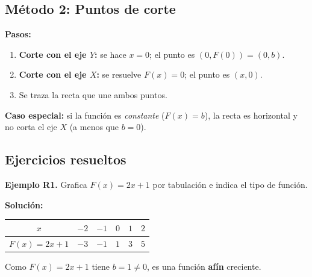 \documentclass[12pt, letterpaper]{article}
\begin{document}
\subsection{Método 2: Puntos de corte}

\begin{cuadropasos}
  \textbf{Pasos:}
  \begin{enumerate}[leftmargin=*]
    \item \textbf{Corte con el eje $Y$:} se hace $x = 0$; el punto es $(0, F(0)) = (0, b)$.
    \item \textbf{Corte con el eje $X$:} se resuelve $F(x) = 0$; el punto es $(x, 0)$.
    \item Se traza la recta que une ambos puntos.
  \end{enumerate}
\end{cuadropasos}

\begin{cuadroadvertencia}
  \textbf{Caso especial:} si la función es \emph{constante} ($F(x) = b$), la recta es horizontal y no corta el eje $X$ (a menos que $b = 0$).
\end{cuadroadvertencia}

\subsection{Ejercicios resueltos}

\textbf{Ejemplo R1.} Grafica $F(x) = 2x + 1$ por tabulación e indica el tipo de función.

\begin{cuadrosolucion}
  \textbf{Solución:}
  \begin{center}
    \begin{tabular}{c|ccccc}
      \toprule
      $x$             & $-2$ & $-1$ & $0$ & $1$ & $2$ \\
      \midrule
      $F(x) = 2x + 1$ & $-3$ & $-1$ & $1$ & $3$ & $5$ \\
      \bottomrule
    \end{tabular}
  \end{center}
  \begin{center}
  \end{center}
  Como $F(x) = 2x + 1$ tiene $b = 1 \neq 0$, es una función \textbf{afín} creciente.
\end{cuadrosolucion}
\end{document}
